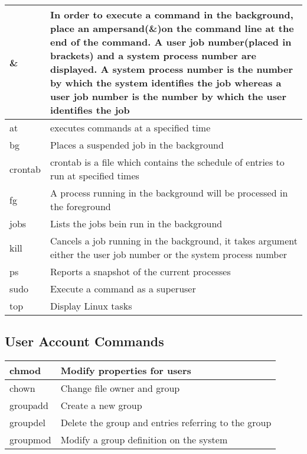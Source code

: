 \begin{tabular}{|p{}|p{}|} \hline
\&      & In order to execute a command in the background, place an ampersand(\&)on the command line at the end of the command. A user job number(placed in brackets) and a system process number are displayed. A system process number is the number by which the system identifies the job whereas a user job number is the number by which the user identifies the job \\ \hline
at      & executes commands at a specified time \\ \hline
bg      & Places a suspended job in the background \\ \hline
crontab & crontab is a file which contains the schedule of entries to run at specified times \\ \hline
fg      & A process running in the background will be processed in the foreground \\ \hline
jobs    & Lists the jobs bein run in the background \\ \hline
kill    & Cancels a job running in the background, it takes argument either the user job number or the system process number \\ \hline
ps      & Reports a snapshot of the current processes \\ \hline
sudo    & Execute a command as a superuser \\ \hline
top     & Display Linux tasks \\ \hline
\end{tabular}


\subsection{User Account Commands}

\begin{tabular}{|p{}|p{}|} \hline
chmod    & Modify properties for users \\ \hline
chown    & Change file owner and group \\ \hline
groupadd & Create a new group \\ \hline
groupdel & Delete the group and entries referring to the group \\ \hline
groupmod & Modify a group definition on the system \\ \hline
\end{tabular}

